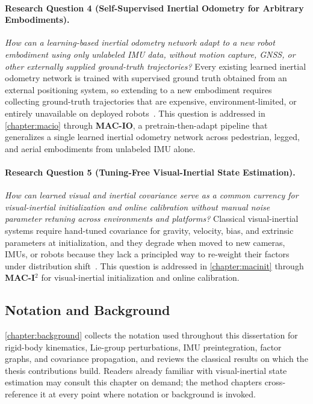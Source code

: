 \paragraph{Research Question 4 (Self-Supervised Inertial Odometry for Arbitrary Embodiments).}
\textit{How can a learning-based inertial odometry network adapt to a new robot embodiment using only unlabeled IMU data, without motion capture, GNSS, or other externally supplied ground-truth trajectories?}
Every existing learned inertial odometry network is trained with supervised ground truth obtained from an external positioning system, so extending to a new embodiment requires collecting ground-truth trajectories that are expensive, environment-limited, or entirely unavailable on deployed robots~\cite{liu2020tlio, CioffiRal2023}.
This question is addressed in \cref{chapter:macio} through \textbf{MAC-IO}, a pretrain-then-adapt pipeline that generalizes a single learned inertial odometry network across pedestrian, legged, and aerial embodiments from unlabeled IMU alone.

\paragraph{Research Question 5 (Tuning-Free Visual-Inertial State Estimation).}
\textit{How can learned visual and inertial covariance serve as a common currency for visual-inertial initialization and online calibration without manual noise parameter retuning across environments and platforms?}
Classical visual-inertial systems require hand-tuned covariance for gravity, velocity, bias, and extrinsic parameters at initialization, and they degrade when moved to new cameras, IMUs, or robots because they lack a principled way to re-weight their factors under distribution shift~\cite{qin2018vins, geneva2020openvins, leutenegger2015keyframe}.
This question is addressed in \cref{chapter:macinit} through \textbf{MAC-I$^2$} for visual-inertial initialization and online calibration.

\subsection{Notation and Background}
\label{subsec:org_background}

\cref{chapter:background} collects the notation used throughout this dissertation for rigid-body kinematics, Lie-group perturbations, IMU preintegration, factor graphs, and covariance propagation, and reviews the classical results on which the thesis contributions build.
Readers already familiar with visual-inertial state estimation may consult this chapter on demand; the method chapters cross-reference it at every point where notation or background is invoked.

